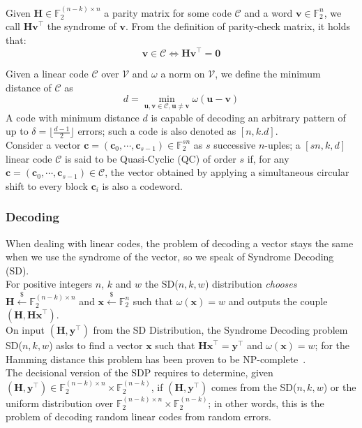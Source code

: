 Given ${\mathbf{H} \in \mathds{F}_2^{(n-k)\times n}}$ a parity matrix for some code $\mathcal{C}$ and a word ${\mathbf{v} \in \mathds{F}_2^n}$, we call $\mathbf{Hv}^{\top}$ the syndrome of $\mathbf{v}$. From the definition of parity-check matrix, it holds that:
\begin{equation*}
    \mathbf{v} \in \mathcal{C} \iff \mathbf{Hv}^{\top} = \mathbf{0}
\end{equation*}

Given a linear code $\mathcal{C}$ over $\mathcal{V}$ and $\omega$ a norm on $\mathcal{V}$, we define the minimum distance of $\mathcal{C}$ as
\begin{equation*}
    d = \min_{\mathbf{u, v} \in \mathcal{C}, \mathbf{u}\neq \mathbf{v}} \omega(\mathbf{u} - \mathbf{v})
\end{equation*}
A code with minimum distance $d$ is capable of decoding an arbitrary pattern of up to $\delta = \lfloor \frac{d-1}{2}\rfloor$ errors; such a code is also denoted as $[n, k. d]$.\\

Consider a vector $\mathbf{c} = (\mathbf{c}_0, \cdots, \mathbf{c}_{s-1}) \in \mathds{F}_2^{sn}$ as $s$ successive $n$-uples; a $[sn, k, d]$ linear code $\mathcal{C}$ is said to be Quasi-Cyclic (QC) of order $s$ if, for any $\mathbf{c} = (\mathbf{c}_0, \cdots, \mathbf{c}_{s-1}) \in \mathcal{C}$, the vector obtained by applying a simultaneous circular shift to every block $\mathbf{c}_i$ is also a codeword.

\subsubsection*{Decoding}

When dealing with linear codes, the problem of decoding a vector stays the same when we use the syndrome of the vector, so we speak of Syndrome Decoding (SD).\\

For positive integers $n$, $k$ and $w$ the SD($n, k, w$) distribution \textit{chooses} $\mathbf{H} \xleftarrow{\mathdollar} \mathds{F}_2^{(n-k)\times n}$ and $\mathbf{x} \xleftarrow{\mathdollar} \mathds{F}_2^n$ such that $\omega(\mathbf{x}) = w$ and outputs the couple $(\mathbf{H}, \mathbf{Hx}^{\top})$.\\

On input $(\mathbf{H}, \mathbf{y}^{\top})$ from the SD Distribution, the Syndrome Decoding problem SD($n, k, w$) asks to find a vector $\mathbf{x}$ such that $\mathbf{Hx}^{\top} = \mathbf{y}^{\top}$ and $\omega(\mathbf{x}) = w$; for the Hamming distance this problem has been proven to be NP-complete~\cite{berlekamp1978inherent}.\\

The decisional version of the SDP requires to determine, given $(\mathbf{H}, \mathbf{y}^{\top}) \in \mathds{F}_2^{(n-k)\times n} \times \mathds{F}_2^{(n-k)}$, if $(\mathbf{H}, \mathbf{y}^{\top})$ comes from the SD($n, k, w$) or the uniform distribution over $\mathds{F}_2^{(n-k)\times n} \times \mathds{F}_2^{(n-k)}$; in other words, this is the problem of decoding random linear codes from random errors.



